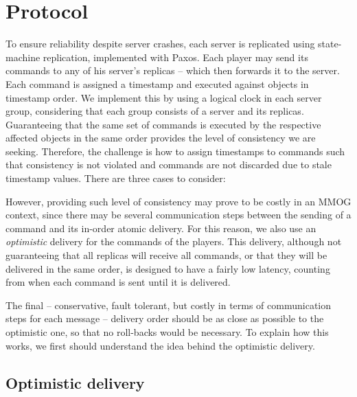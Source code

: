 \documentclass[times, 10pt]{article}
\begin{document}
\section{Protocol}

To ensure reliability despite server crashes, each server is replicated using state-machine replication, implemented with Paxos. Each player may send its commands to any of his server's replicas -- which then forwards it to the server. Each command is assigned a timestamp and executed against objects in timestamp order. We implement this by using a logical clock in each server group, considering that each group consists of a server and its replicas. Guaranteeing that the same set of commands is executed by the respective affected objects in the same order provides the level of consistency we are seeking. Therefore, the challenge is how to assign timestamps to commands such that consistency is not violated and commands are not discarded due to stale timestamp values. There are three cases to consider:

However, providing such level of consistency may prove to be costly in an MMOG context, since there may be several communication steps between the sending of a command and its in-order atomic delivery. For this reason, we also use an \emph{optimistic} delivery for the commands of the players. This delivery, although not guaranteeing that all replicas will receive all commands, or that they will be delivered in the same order, is designed to have a fairly low latency, counting from when each command is sent until it is delivered.

The final -- conservative, fault tolerant, but costly in terms of communication steps for each message -- delivery order should be as close as possible to the optimistic one, so that no roll-backs would be necessary. To explain how this works, we first should understand the idea behind the optimistic delivery.

\subsection{Optimistic delivery}

\end{document}
